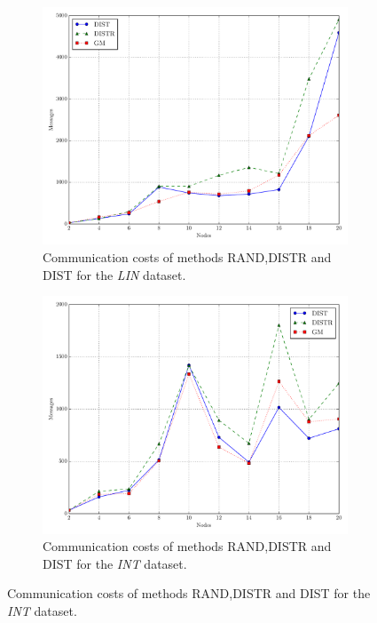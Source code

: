 \begin{figure}[!t]
\begin{subfigure}{0.32\textwidth}
  \includegraphics[width=\linewidth]{img/matching_msg_linear.pdf}
  \caption{Communication costs of methods RAND,DISTR and DIST for the \emph{LIN} dataset.}
\end{subfigure}\hfill
\begin{subfigure}{0.32\textwidth}
  \includegraphics[width=\linewidth]{img/matching_msg_interweaving.pdf}
  \caption{Communication costs of methods RAND,DISTR and DIST for the \emph{INT} dataset.}
\end{subfigure}\hfill

\end{figure}
